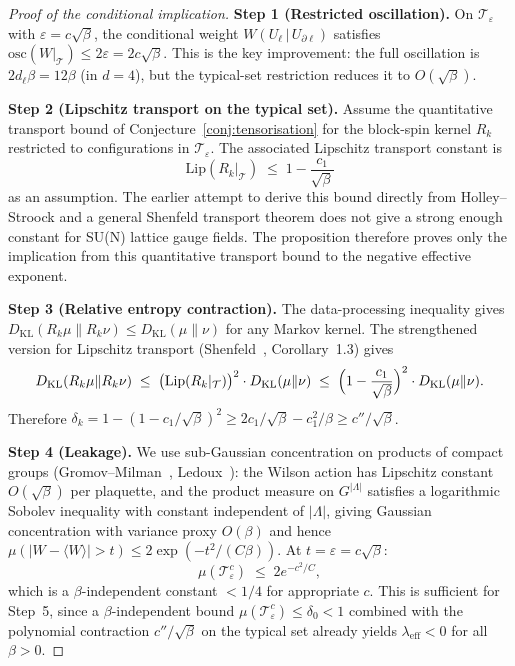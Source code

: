 \documentclass[12pt,a4paper]{article}
\theoremstyle{definition}
\theoremstyle{plain}
\theoremstyle{remark}
\begin{document}
\begin{proof}[Proof of the conditional implication]
\textbf{Step 1 (Restricted oscillation).}
On $\mathcal{T}_\varepsilon$ with $\varepsilon = c\sqrt{\beta}$,
the conditional weight $W(U_\ell \,|\, U_{\partial\ell})$ satisfies
$\mathrm{osc}(W|_{\mathcal{T}}) \leq 2\varepsilon = 2c\sqrt{\beta}$.
This is the key improvement: the full oscillation is $2 d_\ell \beta = 12\beta$
(in $d=4$), but the typical-set restriction reduces it to $O(\sqrt{\beta})$.

\medskip
\textbf{Step 2 (Lipschitz transport on the typical set).}
Assume the quantitative transport bound of Conjecture~\ref{conj:tensorisation}
for the block-spin kernel $R_k$ restricted to configurations in
$\mathcal{T}_\varepsilon$. The associated Lipschitz transport constant is
\[
  \mathrm{Lip}(R_k|_{\mathcal{T}})
  \;\leq\; 1 - \frac{c_1}{\sqrt{\beta}}
\]
as an assumption. The earlier attempt to derive this bound directly from
Holley--Stroock and a general Shenfeld transport theorem does not give a
strong enough constant for SU(N) lattice gauge fields. The proposition
therefore proves only the implication from this quantitative transport bound
to the negative effective exponent.

\medskip
\textbf{Step 3 (Relative entropy contraction).}
The data-processing inequality gives $D_{\mathrm{KL}}(R_k\mu \| R_k\nu) \leq D_{\mathrm{KL}}(\mu\|\nu)$
for any Markov kernel.  The strengthened version for Lipschitz transport
(Shenfeld~\cite{Shenfeld2024}, Corollary~1.3) gives
\[
  D_{\mathrm{KL}}(R_k\mu \| R_k\nu)
  \;\leq\; \bigl(\mathrm{Lip}(R_k|_{\mathcal{T}})\bigr)^2 \cdot D_{\mathrm{KL}}(\mu\|\nu)
  \;\leq\; \Bigl(1 - \frac{c_1}{\sqrt{\beta}}\Bigr)^2 \cdot D_{\mathrm{KL}}(\mu\|\nu).
\]
Therefore $\delta_k = 1 - (1 - c_1/\sqrt{\beta})^2 \geq 2c_1/\sqrt{\beta} - c_1^2/\beta \geq c''/\sqrt{\beta}$.

\medskip
\textbf{Step 4 (Leakage).}
We use sub-Gaussian concentration on products of compact groups
(Gromov--Milman~\cite{GromovMilman1983}, Ledoux~\cite{Ledoux2001}):
the Wilson action has Lipschitz constant $O(\sqrt{\beta})$ per plaquette,
and the product measure on $G^{|\Lambda|}$ satisfies a logarithmic Sobolev
inequality with constant independent of $|\Lambda|$, giving Gaussian
concentration with variance proxy $O(\beta)$
and hence $\mu(|W - \langle W\rangle| > t) \leq 2\exp(-t^2/(C\beta))$.
At $t = \varepsilon = c\sqrt{\beta}$:
\[
  \mu(\mathcal{T}_\varepsilon^c) \;\leq\; 2e^{-c^2/C},
\]
which is a $\beta$-independent constant $< 1/4$ for appropriate $c$.
This is sufficient for Step~5, since a $\beta$-independent bound
$\mu(\mathcal{T}_\varepsilon^c) \leq \delta_0 < 1$ combined with the
polynomial contraction $c''/\sqrt{\beta}$ on the typical set
already yields $\lambda_{\mathrm{eff}} < 0$ for all $\beta > 0$.


\end{proof}
\end{document}
